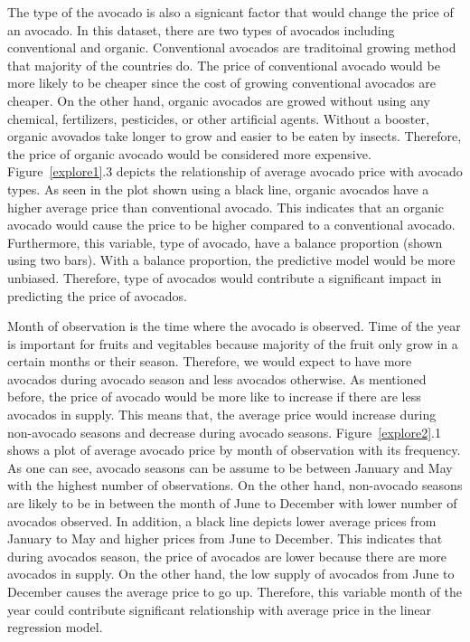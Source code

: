 \documentclass[11pt]{article}\usepackage[]{graphicx}\usepackage[]{color}
\begin{document}
\noindent The type of the avocado is also a signicant factor that would change the price of an avocado. In this dataset, there are two types of avocados including conventional and organic. Conventional avocados are traditoinal growing method that majority of the countries do. The price of conventional avocado would be more likely to be cheaper since the cost of growing conventional avocados are cheaper. On the other hand, organic avocados are growed without using any chemical, fertilizers, pesticides, or other artificial agents. Without a booster, organic avovados take longer to grow and easier to be eaten by insects. Therefore, the price of organic avocado would be considered more expensive. Figure~\ref{explore1}.3 depicts the relationship of average avocado price with avocado types. As seen in the plot shown using a black line, organic avocados have a higher average price than conventional avocado. This indicates that an organic avocado would cause the price to be higher compared to a conventional avocado. Furthermore, this variable, type of avocado, have a balance proportion (shown using two bars). With a balance proportion, the predictive model would be more unbiased. Therefore, type of avocados would contribute a significant impact in predicting the price of avocados.      
\hfill \break

\noindent Month of observation is the time where the avocado is observed. Time of the year is important for fruits and vegitables because majority of the fruit only grow in a certain months or their season. Therefore, we would expect to have more avocados during avocado season and less avocados otherwise. As mentioned before, the price of avocado would be more like to increase if there are less avocados in supply. This means that, the average price would increase during non-avocado seasons and decrease during avocado seasons. Figure~\ref{explore2}.1 shows a plot of average avocado price by month of observation with its frequency. As one can see, avocado seasons can be assume to be between January and May with the highest number of observations. On the other hand, non-avocado seasons are likely to be in between the month of June to December with lower number of avocados observed. In addition, a black line depicts lower average prices from January to May and higher prices from June to December. This indicates that during avocados season, the price of avocados are lower because there are more avocados in supply. On the other hand, the low supply of avocados from June to December causes the average price to go up. Therefore, this variable month of the year could contribute significant relationship with average price in the linear regression model.
\end{document}
